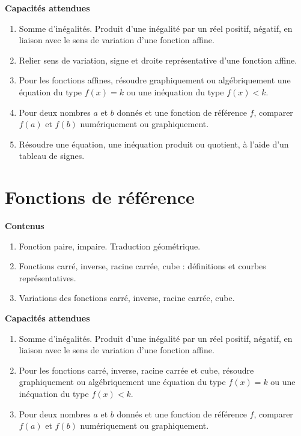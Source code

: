 \documentclass[10pt,a4paper]{article}
\begin{document}
\textbf{Capacités attendues}

\begin{enumerate}
\item Somme d'inégalités. Produit d'une inégalité par un réel positif, négatif, en liaison avec le sens de variation d'une fonction affine.
\item  Relier sens de variation, signe et droite représentative d'une fonction affine.
\item  Pour les fonctions affines, résoudre graphiquement ou algébriquement une équation du type $f(x) = k$ ou une inéquation du type $f(x) < k$. 
\item Pour deux nombres $a$ et $b$ donnés et une fonction de référence $f$, comparer $f(a)$ et $f(b)$ numériquement ou graphiquement.
\item Résoudre une équation, une inéquation produit ou quotient, à l'aide d'un tableau de signes. 
\end{enumerate}
 



\section{Fonctions de référence}

\textbf{Contenus}

\begin{enumerate}
\item Fonction paire, impaire. Traduction géométrique.
\item Fonctions carré, inverse, racine carrée, cube : définitions et courbes représentatives.
\item Variations des fonctions carré, inverse, racine carrée, cube.
\end{enumerate}

\textbf{Capacités attendues}

\begin{enumerate}
\item Somme d'inégalités. Produit d'une inégalité par un réel positif, négatif, en liaison avec le sens de variation d'une fonction affine.
\item  Pour les fonctions carré, inverse, racine carrée et cube, résoudre graphiquement ou algébriquement une équation du type $f(x) = k$ ou une inéquation du type $f(x) < k$. 
\item Pour deux nombres $a$ et $b$ donnés et une fonction de référence $f$, comparer $f(a)$ et $f(b)$ numériquement ou graphiquement.
\end{enumerate}
 
\end{document}
